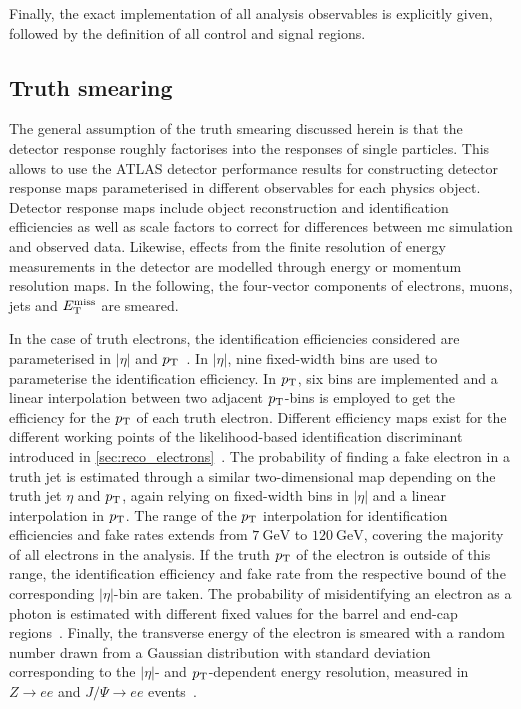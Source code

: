 Finally, the exact implementation of all analysis observables is explicitly given, followed by the definition of all control and signal regions.

\subsection{Truth smearing}\label{sec:truth_smearing}

The general assumption of the truth smearing discussed herein is that the detector response roughly factorises into the responses of single particles.
This allows to use the ATLAS detector performance results for constructing detector response maps parameterised in different observables for each physics object.
Detector response maps include object reconstruction and identification efficiencies as well as scale factors to correct for differences between \gls{mc} simulation and observed data.
Likewise, effects from the finite resolution of energy measurements in the detector are modelled through energy or momentum resolution maps. In the following, the four-vector components of electrons, muons, jets and $E_{\textrm{T}}^{\textrm{miss}}$ are smeared. 

In the case of truth electrons, the identification efficiencies considered are parameterised in $\vert\eta\vert$ and $p_{\mathrm{T}}$~\cite{PERF-2017-01}. In $\vert\eta\vert$, nine fixed-width bins are used to parameterise the identification efficiency. In $p_{\mathrm{T}}$, six bins are implemented and a linear interpolation between two adjacent $p_{\mathrm{T}}$-bins is employed to get the efficiency for the  $p_{\mathrm{T}}$ of each truth electron.
Different efficiency maps exist for the different working points of the likelihood-based identification discriminant introduced in \cref{sec:reco_electrons}~\cite{PERF-2017-01}.
The probability of finding a fake electron in a truth jet is estimated through a similar two-dimensional map depending on the truth jet $\eta$ and $p_{\mathrm{T}}$, again relying on fixed-width bins in $\vert\eta\vert$ and a linear interpolation in $p_{\mathrm{T}}$. %
The range of the $p_{\mathrm{T}}$ interpolation for identification efficiencies and fake rates extends from $\SI{7}{\GeV}$ to $\SI{120}{\GeV}$, covering the majority of all electrons in the analysis.
If the truth $p_{\mathrm{T}}$ of the electron is outside of this range, the identification efficiency and fake rate from the respective bound of the corresponding $\vert\eta\vert$-bin are taken.
The probability of misidentifying an electron as a photon is estimated with different fixed values for the barrel and end-cap regions~\cite{PERF-2017-02}.
Finally, the transverse energy of the electron is smeared with a random number drawn from a Gaussian distribution with standard deviation corresponding to the $\vert\eta\vert$- and $p_{\mathrm{T}}$-dependent energy resolution, measured in $Z\to ee$ and $J/\Psi\to ee$ events~\cite{PERF-2017-03}.

